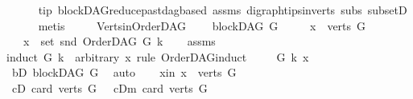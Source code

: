 \begin{isabellebody}
\ \ \ \ \isamarkupfalse%
\ tip\ blockDAG{\isachardot}{\kern0pt}reduce{\isacharunderscore}{\kern0pt}past{\isacharunderscore}{\kern0pt}dagbased\ assms{\isacharparenleft}{\kern0pt}{}{\isacharparenright}{\kern0pt}\ digraph{\isachardot}{\kern0pt}tips{\isacharunderscore}{\kern0pt}in{\isacharunderscore}{\kern0pt}verts\ subs\ subsetD\isanewline
\ \ \ \ \isamarkupfalse%
\ metis\ \ \ \ \isanewline
{}\isamarkupfalse%
%
\endisatagproof
{\isafoldproof}%
%
\isadelimproof
%
\endisadelimproof
%
\isadelimdocument
%
\endisadelimdocument
%
\isatagdocument
%
\isamarkuptrue%
%
\endisatagdocument
{\isafolddocument}%
%
\isadelimdocument
%
\endisadelimdocument
{}\isamarkupfalse%
\ Verts{\isacharunderscore}{\kern0pt}in{\isacharunderscore}{\kern0pt}OrderDAG{\isacharcolon}{\kern0pt}\ \isanewline
\ \ \ {\isachardoublequoteopen}blockDAG\ G{\isachardoublequoteclose}\isanewline
\ \ \ \ \ {\isachardoublequoteopen}x\ {\isasymin}\ verts\ G{\isachardoublequoteclose}\isanewline
\ \ \ {\isachardoublequoteopen}x\ {\isasymin}\ set\ {\isacharparenleft}{\kern0pt}snd\ {\isacharparenleft}{\kern0pt}OrderDAG\ G\ k{\isacharparenright}{\kern0pt}{\isacharparenright}{\kern0pt}{\isachardoublequoteclose}\isanewline
%
\isadelimproof
\ \ %
\endisadelimproof
%
\isatagproof
{}\isamarkupfalse%
\ assms\isanewline
{}\isamarkupfalse%
{\isacharparenleft}{\kern0pt}induct\ G\ k\ \ arbitrary{\isacharcolon}{\kern0pt}\ x\ rule{\isacharcolon}{\kern0pt}\ OrderDAG{\isachardot}{\kern0pt}induct{\isacharparenright}{\kern0pt}\isanewline
\ \ \isamarkupfalse%
\ {\isacharparenleft}{\kern0pt}{}\ G\ k\ x{\isacharparenright}{\kern0pt}\isanewline
\ \ \isamarkupfalse%
\ \isamarkupfalse%
\ bD{\isacharcolon}{\kern0pt}\ {\isachardoublequoteopen}blockDAG\ G{\isachardoublequoteclose}\ \isamarkupfalse%
\ auto\isanewline
\ \ \isamarkupfalse%
\ x{\isacharunderscore}{\kern0pt}in{\isacharcolon}{\kern0pt}\ {\isachardoublequoteopen}x\ {\isasymin}\ verts\ G{\isachardoublequoteclose}\isanewline
\ \ \isamarkupfalse%
\ \isamarkupfalse%
\ {\isacharparenleft}{\kern0pt}cD{}{\isacharparenright}{\kern0pt}\ {\isachardoublequoteopen}card\ {\isacharparenleft}{\kern0pt}verts\ G{\isacharparenright}{\kern0pt}\ {\isacharequal}{\kern0pt}\ {}{\isachardoublequoteclose}{\isacharbar}{\kern0pt}\ {\isacharparenleft}{\kern0pt}cDm{\isacharparenright}{\kern0pt}\ {\isachardoublequoteopen}card\ {\isacharparenleft}{\kern0pt}verts\ G{\isacharparenright}{\kern0pt}\ {\isasymnoteq}\ {}{\isachardoublequoteclose}\ \isamarkupfalse%

\end{isabellebody}
